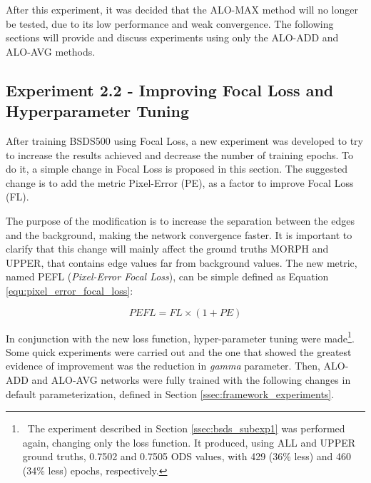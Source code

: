 
After this experiment, it was decided that the ALO-MAX method will no longer be tested, due to its low performance and weak convergence. %
The following sections will provide and discuss experiments using only the ALO-ADD and ALO-AVG methods.

\subsection{Experiment 2.2 - Improving Focal Loss and Hyperparameter Tuning}
\label{ssec:bsds_subexp2}

After training BSDS500 using Focal Loss, a new experiment was developed to try to increase the results achieved and decrease the number of training epochs.
To do it, a simple change in Focal Loss is proposed in this section.
The suggested change is to add the metric Pixel-Error (PE), as a factor to improve Focal Loss (FL).

The purpose of the modification is to increase the separation between the edges and the background, making the network convergence faster.
It is important to clarify that this change will mainly affect the ground truths MORPH and UPPER, that contains edge values far from background values.
The new metric, named PEFL (\textit{Pixel-Error Focal Loss}), can be simple defined as Equation \ref{equ:pixel_error_focal_loss}:

\begin{equation}
  PEFL = FL \times (1 + PE)
  \label{equ:pixel_error_focal_loss}
\end{equation}

In conjunction with the new loss function, hyper-parameter tuning were made\footnote{~The experiment described in Section \ref{ssec:bsds_subexp1} was performed again, changing only the loss function. It produced, using ALL and UPPER ground truths, 0.7502 and 0.7505 ODS values, with 429 (36\% less) and 460 (34\% less) epochs, respectively.}.
Some quick experiments were carried out and the one that showed the greatest evidence of improvement was the reduction in \textit{gamma} parameter.
Then, ALO-ADD and ALO-AVG networks were fully trained with the following changes in default parameterization, defined in Section \ref{ssec:framework_experiments}.

